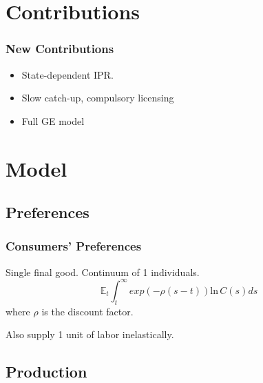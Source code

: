 \documentclass{beamer}
\begin{document}
\section{Contributions}
\label{sec:contributions}

\begin{frame}[t]\frametitle{New Contributions} 
  \begin{itemize}
    \item<+-> State-dependent IPR.
    \item<+-> Slow catch-up, compulsory licensing %
    \item<+-> Full GE model %
  \end{itemize}
\end{frame}

\section{Model}
\label{sec:model}

\subsection{Preferences}
\label{sub:preferences}

\begin{frame}[t]\frametitle{Consumers' Preferences} 
  Single final good.  Continuum of 1 individuals.
  \begin{equation*} \label{eq:pref}
    \mathbb{E}_t \int_t^\infty exp(-\rho(s - t))\mathrm{ln}\,   C(s)ds
  \end{equation*}
  where $\rho$ is the discount factor.
  
  Also supply 1 unit of labor inelastically. 
\end{frame}

\subsection{Production}
\label{sub:production}
\end{document}
